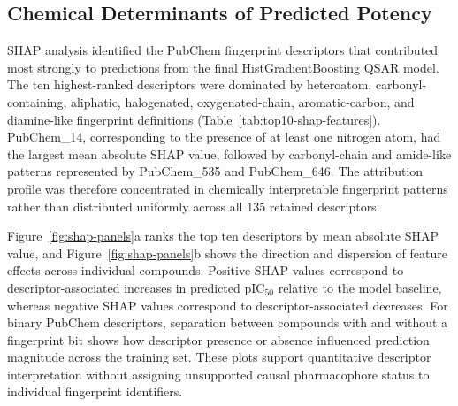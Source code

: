 \documentclass[11pt]{article}
\begin{document}
\begin{table}[htbp]
\centering
\scriptsize
\setlength{\tabcolsep}{3pt}
\caption[Y-randomization summary]{Y-randomization summary for selected regressors after response-value randomization.}
\label{tab:y-randomization}
\end{table}

\subsection{Chemical Determinants of Predicted Potency}

SHAP analysis identified the PubChem fingerprint descriptors that contributed most strongly to predictions from the final HistGradientBoosting QSAR model. The ten highest-ranked descriptors were dominated by heteroatom, carbonyl-containing, aliphatic, halogenated, oxygenated-chain, aromatic-carbon, and diamine-like fingerprint definitions (Table~\ref{tab:top10-shap-features}). PubChem\_14, corresponding to the presence of at least one nitrogen atom, had the largest mean absolute SHAP value, followed by carbonyl-chain and amide-like patterns represented by PubChem\_535 and PubChem\_646. The attribution profile was therefore concentrated in chemically interpretable fingerprint patterns rather than distributed uniformly across all 135 retained descriptors.

Figure~\ref{fig:shap-panels}a ranks the top ten descriptors by mean absolute SHAP value, and Figure~\ref{fig:shap-panels}b shows the direction and dispersion of feature effects across individual compounds. Positive SHAP values correspond to descriptor-associated increases in predicted pIC$_{50}$ relative to the model baseline, whereas negative SHAP values correspond to descriptor-associated decreases. For binary PubChem descriptors, separation between compounds with and without a fingerprint bit shows how descriptor presence or absence influenced prediction magnitude across the training set. These plots support quantitative descriptor interpretation without assigning unsupported causal pharmacophore status to individual fingerprint identifiers.
\end{document}
